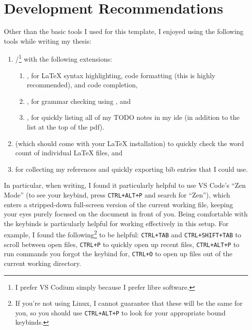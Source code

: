 \section{Development Recommendations}
\label{chap:introduction:sec:development-recommendations}

Other than the basic tools I used for this template, I enjoyed using the
following tools while writing my thesis:

\begin{enumerate}
    \item {}/\footnote{I prefer VS Codium
              simply because I prefer libre software.} with the following
          extensions:
          \begin{enumerate}
              \item {},
                    for \LaTeX{} syntax highlighting, code formatting (this
                    is highly recommended), and code completion,
              \item {}, for
                    grammar checking using
                    , and
              \item {}, for
                    quickly listing all of my TODO notes in my \acs{ide} (in addition to
                    the list at the top of the \acs{pdf}).
          \end{enumerate}
    \item {} (which
    should come with your \LaTeX{} installation) to quickly check the word count
    of individual \LaTeX{} files, and
    \item {} for collecting my
    references and quickly exporting bib entries that I could use.
\end{enumerate}

In particular, when writing, I found it particularly helpful to use VS Code's
``Zen Mode'' (to see your keybind, press \texttt{CTRL+ALT+P} and search for
``Zen''), which enters a stripped-down full-screen version of the current
working file, keeping your eyes purely focused on the document in front of you.
Being comfortable with the keybinds is particularly helpful for working
effectively in this setup. For example, I found the following\footnote{If you're
not using Linux, I cannot guarantee that these will be the same for you, so you
should use \texttt{CTRL+ALT+P} to look for your appropriate bound keybinds.} to
be helpful: \texttt{CTRL+TAB} and \texttt{CTRL+SHIFT+TAB} to scroll between open
files, \texttt{CTRL+P} to quickly open up recent files, \texttt{CTRL+ALT+P} to
run commands you forgot the keybind for, \texttt{CTRL+O} to open up files out of
the current working directory.

